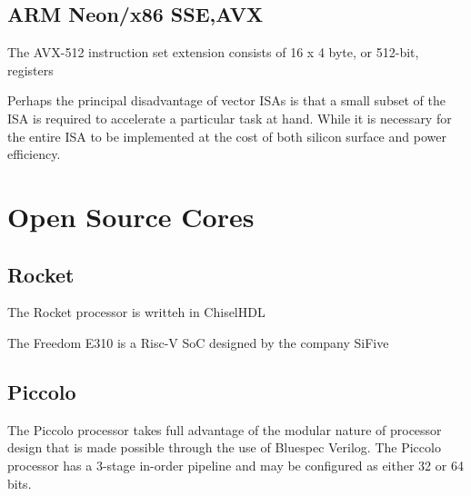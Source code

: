 \documentclass[a4paper,8pt]{report}
\begin{document}
\subsection{ARM Neon/x86 SSE,AVX}
The AVX-512 instruction set extension
consists of 16 x 4 byte, or 512-bit, registers

Perhaps the principal disadvantage of vector ISAs is that a small subset of the
ISA is required to accelerate a particular task at hand. While it is necessary
for the entire ISA to be implemented at the cost of both silicon surface and
power efficiency.






\section{Open Source Cores}

\subsection{Rocket}
The Rocket processor is writteh in ChiselHDL

The Freedom E310 is a Risc-V SoC designed by the company SiFive

\subsection{Piccolo}

The Piccolo processor takes full advantage of the modular nature of processor
design that is made possible through the use of Bluespec Verilog. 
The Piccolo processor has a 3-stage in-order pipeline and may be configured as
either 32 or 64 bits.



\end{document}
